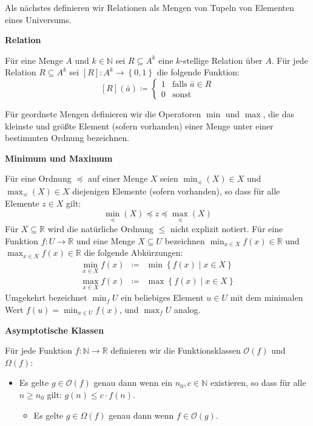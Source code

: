 Als nächstes definieren wir Relationen als Mengen von Tupeln von Elementen
eines Universums. 
\begin{defn}
\textbf{\label{def:relation}Relation}

Für eine Menge $A$ und $k\in\mathbb{N}$ sei $R\subseteq A^{k}$
eine $k$-stellige Relation über $A$. Für jede Relation $R\subseteq A^{k}$
sei $\left[R\right]:A^{k}\rightarrow\left\{ 0,1\right\} $ die folgende
Funktion: 
\[
\left[R\right]\left(\bar{a}\right)\coloneqq\begin{cases}
1 & \mathrm{falls}\,\,\bar{a}\in R\\
0 & \mathrm{sonst}
\end{cases}
\]
\end{defn}
Für geordnete Mengen definieren wir die Operatoren $\min$ und $\max$,
die das kleinste und größte Element (sofern vorhanden) einer Menge
unter einer bestimmten Ordnung bezeichnen.
\begin{defn}
\textbf{Minimum und Maximum}

Für eine Ordnung $\preceq$ auf einer Menge $X$ seien $\min_{\preceq}\left(X\right)\in X$
und $\max_{\preceq}\left(X\right)\in X$ diejenigen Elemente (sofern
vorhanden), so dass für alle Elemente $z\in X$ gilt:
\[
\min_{\preceq}\left(X\right)\preceq z\preceq\max_{\preceq}\left(X\right)
\]
Für $X\subseteq\mathbb{R}$ wird die natürliche Ordnung $\leqslant$
nicht explizit notiert. Für eine Funktion $f:U\rightarrow\mathbb{R}$
und eine Menge $X\subseteq U$ bezeichnen $\min_{x\in X}f\left(x\right)\in\mathbb{R}$
und $\max_{x\in X}f\left(x\right)\in\mathbb{R}$ die folgende Abkürzungen:
\begin{eqnarray*}
\min_{x\in X}f\left(x\right) & \coloneqq & \min\left\{ f\left(x\right)\mid x\in X\right\} \\
\max_{x\in X}f\left(x\right) & \coloneqq & \max\left\{ f\left(x\right)\mid x\in X\right\} 
\end{eqnarray*}
Umgekehrt bezeichnet $\min_{f}U$ ein beliebiges Element $u\in U$
mit dem minimalen Wert $f\left(u\right)=\min_{x\in U}f\left(x\right)$,
und $\max_{f}U$ analog.
\end{defn}
%
\begin{defn}
\textbf{Asymptotische Klassen}

Für jede Funktion $f:\mathbb{N}\rightarrow\mathbb{R}$ definieren
wir die Funktionsklassen $\mathcal{O}\left(f\right)$ und $\Omega\left(f\right)$:

\end{defn}
\begin{itemize}
\item Es gelte $g\in\mathcal{O}\left(f\right)$ genau dann wenn ein $n_{0},c\in\mathbb{N}$
existieren, so dass für alle $n\geqslant n_{0}$ gilt: $g\left(n\right)\leqslant c\cdot f\left(n\right)$.
\begin{itemize}
\item Es gelte $g\in\Omega\left(f\right)$ genau dann wenn $f\in\mathcal{O}\left(g\right)$.
\end{itemize}
\end{itemize}
